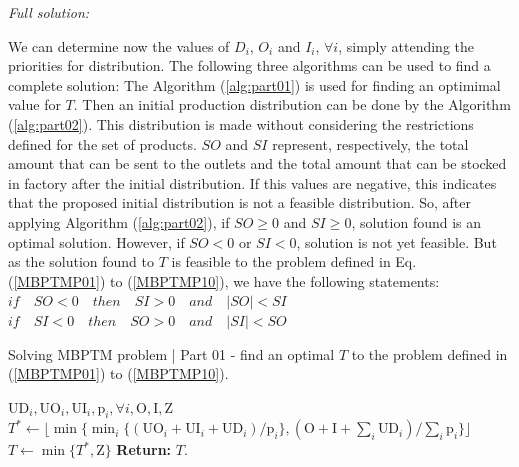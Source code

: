 \documentclass[10pt,fleqn,a4paper,twoside]{article}
\begin{document}
\noindent \emph{Full solution:} 

We can determine now the values of $D_i$, $O_i$ and $I_i$, $\forall i$, simply attending the priorities for distribution. The following three algorithms can be used to find a complete solution: The Algorithm (\ref{alg:part01}) is used for finding an optimimal value for $T$. Then an initial production distribution can be done by the Algorithm (\ref{alg:part02}). This distribution is made without considering the restrictions defined for the set of products. $SO$ and $SI$ represent, respectively, the total amount that can be sent to the outlets and the total amount that can be stocked in factory after the initial distribution. If this values are negative, this indicates that the proposed initial distribution is not a feasible distribution. So, after applying Algorithm (\ref{alg:part02}), if $SO \geq 0$ and $SI \geq 0$, solution found is an optimal solution. However, if $SO < 0$ or $SI <0$, solution is not yet feasible. But as the solution found to $T$ is feasible to the problem defined in Eq. (\ref{MBPTMP01}) to (\ref{MBPTMP10}), we have the following statements: \\

$if \quad SO < 0 \quad then \quad SI > 0 \quad and  \quad |SO| < SI$ \\

$if \quad SI < 0 \quad then \quad SO > 0 \quad and  \quad |SI| < SO$ \\

\begin{algorithm}[h!]
\caption{Solving MBPTM problem | Part 01 - find an optimal $T$ to the problem defined in (\ref{MBPTMP01}) to (\ref{MBPTMP10}).}\label{alg:part01}
\begin{algorithmic}
	\Require $\textrm{UD}_i, \textrm{UO}_i, \textrm{UI}_i, \textrm{p}_i, \forall i, \textrm{O}, \textrm{I}, \textrm{Z}$
	\State $T^* \gets \lfloor{\min \{\min_{i} \{(\textrm{UO}_i + \textrm{UI}_i + \textrm{UD}_i) / \textrm{p}_i\},(\textrm{O} + \textrm{I} + \sum_i \textrm{UD}_i) / \sum_i {\textrm{p}_i}\}}\rfloor$
	\State $T \gets \min \{T^* , \textrm{Z}\}$
\State \textbf{Return:} $T$.
\end{algorithmic}
\end{algorithm}
\end{document}
